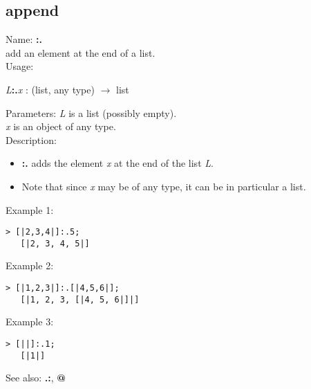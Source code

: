 \subsection{ append }
\noindent Name: \textbf{:.}\\
add an element at the end of a list.\\

\noindent Usage: 
\begin{center}
\emph{L}\textbf{:.}\emph{x} : (\textsf{list}, \textsf{any type}) $\rightarrow$ \textsf{list}\\
\end{center}
Parameters: 
\emph{L} is a list (possibly empty).\\
\emph{x} is an object of any type.\\

\noindent Description: \begin{itemize}

\item \textbf{:.} adds the element \emph{x} at the end of the list \emph{L}.

\item Note that since \emph{x} may be of any type, it can be in particular a list.
\end{itemize}
\noindent Example 1: 
\begin{center}\begin{minipage}{14.8cm}\begin{Verbatim}[frame=single]
   > [|2,3,4|]:.5;
   [|2, 3, 4, 5|]
\end{Verbatim}
\end{minipage}\end{center}
\noindent Example 2: 
\begin{center}\begin{minipage}{14.8cm}\begin{Verbatim}[frame=single]
   > [|1,2,3|]:.[|4,5,6|];
   [|1, 2, 3, [|4, 5, 6|]|]
\end{Verbatim}
\end{minipage}\end{center}
\noindent Example 3: 
\begin{center}\begin{minipage}{14.8cm}\begin{Verbatim}[frame=single]
   > [||]:.1;
   [|1|]
\end{Verbatim}
\end{minipage}\end{center}
See also: \textbf{.:}, \textbf{@}

